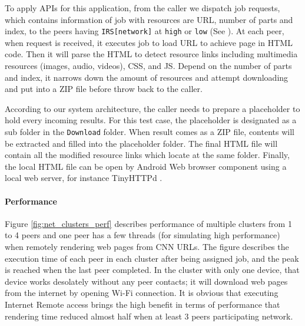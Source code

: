 \documentclass[conference]{IEEEtran}
\begin{document}
To apply APIs for this application, from the caller we dispatch job requests, which contains information of job with resources are URL, number of parts and index, to the peers having \texttt{IRS[network]} at \texttt{high} or \texttt{low} (See ). At each peer, when request is received, it executes job to load URL to achieve page in HTML code. Then it will parse the HTML to detect resource links including multimedia resources (images, audio, videos), CSS, and JS. Depend on the number of parts and index, it narrows down the amount of resources and attempt downloading and put into a ZIP file before throw back to the caller.

According to our system architecture, the caller needs to prepare a placeholder to hold every incoming results. For this test case, the placeholder is designated as a sub folder in the \texttt{Download} folder. When result comes as a ZIP file, contents will be extracted and filled into the placeholder folder. The final HTML file will contain all the modified resource links which locate at the same folder. Finally, the local HTML file can be open by Android Web browser component using a local web server, for instance TinyHTTPd \cite{tinyhttpd}.

\paragraph{Performance}
Figure \ref{fig:net_clusters_perf} describes performance of multiple clusters from 1 to 4 peers and one peer has a few threads (for simulating high performance) when remotely rendering web pages from CNN URLs. The figure describes the execution time of each peer in each cluster after being assigned job, and the peak is reached when the last peer completed. In the cluster with only one device, that device works desolately without any peer contacts; it will download web pages from the internet by opening Wi-Fi connection. It is obvious that executing Internet Remote access brings the high benefit in terms of performance that rendering time reduced almost half when at least 3 peers participating network. 
\end{document}
